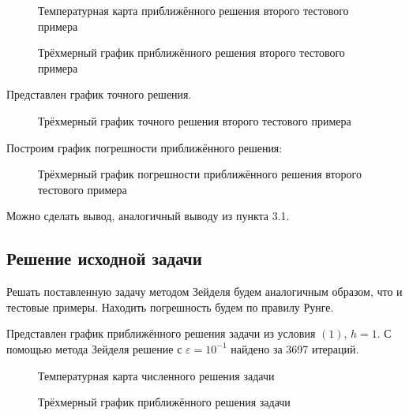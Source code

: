 \documentclass[a4paper, 12pt]{article} %
\begin{document}
\begin{figure}[h]
\caption{Температурная карта приближённого решения второго тестового примера}
\end{figure}

\newpage

\begin{figure}[h]
\caption{Трёхмерный график приближённого решения второго тестового примера}
\end{figure}

Представлен график точного решения.

\begin{figure}[h]
\caption{Трёхмерный график точного решения второго тестового примера}
\end{figure}

Построим график погрешности приближённого решения:

\begin{figure}[h]
\caption{Трёхмерный график погрешности приближённого решения второго тестового примера}
\end{figure}

Можно сделать вывод, аналогичный выводу из пункта 3.1.

\newpage

\subsection{Решение исходной задачи}

Решать поставленную задачу методом Зейделя будем аналогичным образом, что и тестовые примеры. Находить погрешность будем по правилу Рунге.

Представлен график приближённого решения задачи из условия $ (1) $, $ h = 1 $. С помощью метода Зейделя решение с $ \varepsilon = 10^{-1} $ найдено за 3697 итераций.

\begin{figure}[h]
\caption{Температурная карта численного решения задачи}
\end{figure}


\begin{figure}[h]
\caption{Трёхмерный график приближённого решения задачи}
\end{figure}
\end{document}

